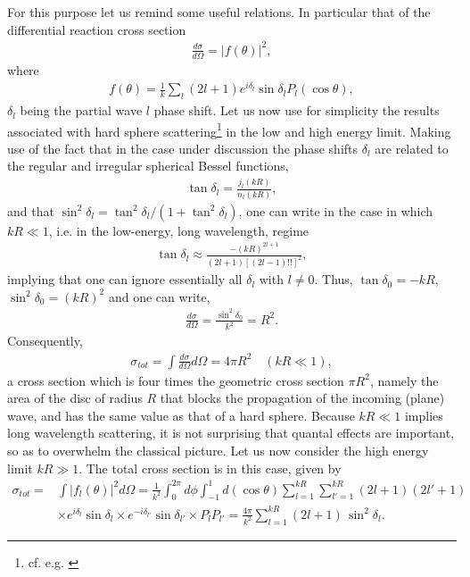 For this purpose let us remind some useful relations. In particular that of the differential reaction cross section 
\begin{align}
\frac{d\sigma}{d\Omega}=|f(\theta)|^2,
\end{align}
where
\begin{align}
f(\theta)=\frac{1}{k}\sum_l(2l+1)e^{i\delta_l}\sin\delta_lP_l(\cos\theta),
\end{align}
$\delta_l$ being the partial wave $l$ phase shift. Let us now use for simplicity the results associated with hard sphere scattering\footnote{cf. e.g. \cite{Sakurai:94}} in the low and high energy limit. Making use of the fact that in the case under discussion the phase shifts $\delta_l$ are related to the regular and irregular spherical Bessel functions,
\begin{align}\label{eq3.2.8}
\tan\delta_l=\frac{j_l(kR)}{n_l(kR)},
\end{align}
and that $\sin^2\delta_l=\tan^2\delta_l/(1+\tan^2\delta_l)$,  one can write in the case in which $kR\ll1$, i.e. in the low-energy, long wavelength, regime
\begin{align}
\tan\delta_l\approx\frac{-(kR)^{2l+1}}{(2l+1)[(2l-1)!!]^2},
\end{align}
implying that one can ignore essentially all $\delta_l$ with $l\neq0$. Thus, $\tan\delta_0=-k R$, $\sin^2\delta_0=(kR)^2$ and one can write,
\begin{align}
\frac{d\sigma}{d\Omega}=\frac{\sin^2\delta_0}{k^2}=R^2.
\end{align}
Consequently,
\begin{align}
\sigma_{tot}=\int\frac{d\sigma}{d\Omega}d\Omega=4\pi R^2\quad(kR\ll1),
\end{align}
a cross section which is four times the geometric cross section $\pi R^2$, namely the area of the disc of radius $R$ that blocks the propagation of the incoming (plane) wave, and has the same value as that of a hard sphere. Because $kR\ll1$  
implies long wavelength scattering, it is not surprising that quantal effects are important, so as to overwhelm the classical picture. Let us now consider the high energy limit $kR\gg 1$. The total cross section is in this case, given by
\begin{align}\label{eq3.2.6}
\nonumber\sigma_{tot}=&\int |f_l(\theta)|^2d\Omega=\frac{1}{k^2}\int_0^{2\pi}d\phi\int_{-1}^{1}d(\cos\theta)\sum_{l=1}^{kR}\sum_{l'=1}^{kR}(2l+1)(2l'+1)\\
&\times e^{i\delta_l}\sin\delta_l\times  e^{-i\delta_{l'}}\sin\delta_{l'}\times P_lP_{l'}=\frac{4\pi}{k^2}\sum_{l=1}^{kR}(2l+1)\,\sin^2\delta_l.
\end{align}
